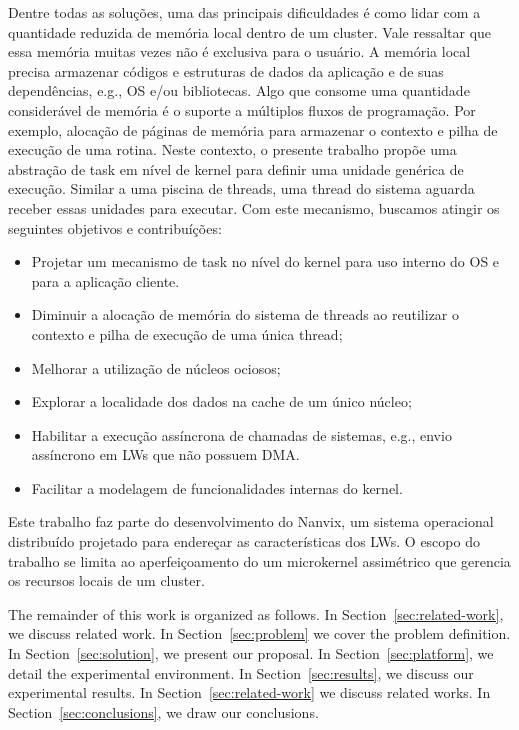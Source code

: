	Dentre todas as soluções, uma das principais dificuldades é como lidar
	com a quantidade reduzida de memória local dentro de um cluster. Vale
	ressaltar que essa memória muitas vezes não é exclusiva para o usuário.
	A memória local precisa armazenar códigos e estruturas de  dados da
	aplicação e de suas dependências, e.g., OS e/ou bibliotecas.
	Algo que consome uma quantidade considerável de memória é o suporte
	a múltiplos fluxos de programação. Por exemplo, alocação de páginas de
	memória para armazenar o contexto e pilha de execução de uma rotina.
	Neste contexto, o presente trabalho propõe uma abstração de task em nível
	de kernel para definir uma unidade genérica de execução. Similar a uma
	piscina de threads, uma thread do sistema aguarda receber essas unidades
	para executar.
	Com este mecanismo, buscamos atingir os seguintes objetivos
	e contribuíções:
	\begin{itemize}
		\item Projetar um mecanismo de task no nível do kernel para uso interno
			do OS e para a aplicação cliente.

		\item Diminuir a alocação de memória do sistema de threads ao
			reutilizar o contexto e pilha de execução de uma única thread;

		\item Melhorar a utilização de núcleos ociosos;

		\item Explorar a localidade dos dados na cache de um único núcleo;

		\item Habilitar a execução assíncrona de chamadas de sistemas, e.g.,
			envio assíncrono em LWs que não possuem DMA.

		\item Facilitar a modelagem de funcionalidades internas do kernel.
	\end{itemize}
	Este trabalho faz parte do desenvolvimento do Nanvix, um sistema operacional
	distribuído projetado para endereçar as características dos LWs. O escopo
	do trabalho se limita ao aperfeiçoamento do um microkernel assimétrico que
	gerencia os recursos locais de um cluster.

	The remainder of this work is organized as follows.
	In Section~\ref{sec:related-work}, we discuss related work.
	In Section~\ref{sec:problem} we cover the problem definition.
	In Section~\ref{sec:solution}, we present our proposal.
	In Section~\ref{sec:platform}, we detail the experimental environment.
	In Section~\ref{sec:results}, we discuss our experimental results.
	In Section~\ref{sec:related-work} we discuss related works.
	In Section~\ref{sec:conclusions}, we draw our conclusions.
